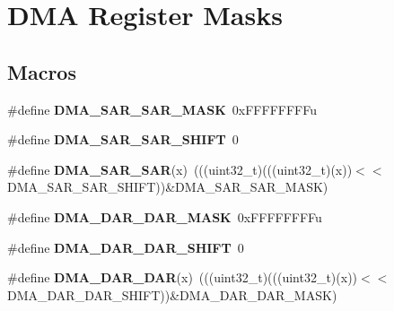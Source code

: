 \hypertarget{group___d_m_a___register___masks}{}\section{D\+MA Register Masks}
\label{group___d_m_a___register___masks}
\subsection*{Macros}
\begin{DoxyCompactItemize}
\item 
\mbox{\label{group___d_m_a___register___masks_ga990e3ca99cc1d75f5942432959953048}} 
\#define {\bfseries D\+M\+A\+\_\+\+S\+A\+R\+\_\+\+S\+A\+R\+\_\+\+M\+A\+SK}~0x\+F\+F\+F\+F\+F\+F\+F\+Fu
\item 
\mbox{\label{group___d_m_a___register___masks_ga869308e6de564860ede4d607b19bce31}} 
\#define {\bfseries D\+M\+A\+\_\+\+S\+A\+R\+\_\+\+S\+A\+R\+\_\+\+S\+H\+I\+FT}~0
\item 
\mbox{\label{group___d_m_a___register___masks_ga68e0d9de2ef332cbd1a302d177a29848}} 
\#define {\bfseries D\+M\+A\+\_\+\+S\+A\+R\+\_\+\+S\+AR}(x)~(((uint32\+\_\+t)(((uint32\+\_\+t)(x))$<$$<$D\+M\+A\+\_\+\+S\+A\+R\+\_\+\+S\+A\+R\+\_\+\+S\+H\+I\+FT))\&D\+M\+A\+\_\+\+S\+A\+R\+\_\+\+S\+A\+R\+\_\+\+M\+A\+SK)
\item 
\mbox{\label{group___d_m_a___register___masks_gad24e68800bcb03e0d2ffad9b026d5c28}} 
\#define {\bfseries D\+M\+A\+\_\+\+D\+A\+R\+\_\+\+D\+A\+R\+\_\+\+M\+A\+SK}~0x\+F\+F\+F\+F\+F\+F\+F\+Fu
\item 
\mbox{\label{group___d_m_a___register___masks_ga6dc575769385f559893116dabe37a002}} 
\#define {\bfseries D\+M\+A\+\_\+\+D\+A\+R\+\_\+\+D\+A\+R\+\_\+\+S\+H\+I\+FT}~0
\item 
\mbox{\label{group___d_m_a___register___masks_ga61f5171a3627441884096a69a3f33ca5}} 
\#define {\bfseries D\+M\+A\+\_\+\+D\+A\+R\+\_\+\+D\+AR}(x)~(((uint32\+\_\+t)(((uint32\+\_\+t)(x))$<$$<$D\+M\+A\+\_\+\+D\+A\+R\+\_\+\+D\+A\+R\+\_\+\+S\+H\+I\+FT))\&D\+M\+A\+\_\+\+D\+A\+R\+\_\+\+D\+A\+R\+\_\+\+M\+A\+SK)

\end{DoxyCompactItemize}
